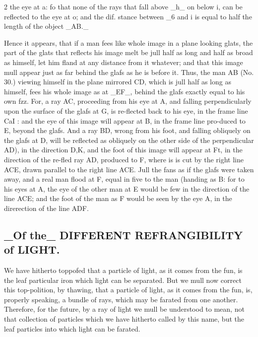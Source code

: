 \documentclass[10pt]{article}
\begin{document}
\begin{multicols}{2}\raggedcolumns
the eye at a: fo that none of the rays that fall above \_h\_ on below i, can be reflected to the eye at o; and the dif. stance between \_6 and i is equal to half the length of the object \_AB.\_

Hence it appears, that if a man fees like whole image in a plane looking glats, the part of the glats that reflects his image melt be jull half as long and half as broad as himself, let him fland at any distance from it whatever; and that this image mull appear just as far behind the glafs as he is before it. Thus, the man AB (No. 30.) viewing himself in the plane mirrored CD, which is jull half as long as himself, fees his whole image as at \_EF\_, behind the glafs exactly equal to his own fzz. For, a ray AC, proceeding from his eye at A, and falling perpendicularly upon the surface of the glafs at G, is re-flected back to his eye, in the frame line CaI : and the eye of this image will appear at B, in the frame line pro-duced to E, beyond the glafs. And a ray BD, wrong from his foot, and falling obliquely on the glafs at D, will be reflected as obliquely on the other side of the perpendicular AD), in the direction D,K, and the foot of this image will appear at Ft, in the direction of the re-fled ray AD, produced to F, where is is cut by the right line ACE, drawn parallel to the right line ACE. Jull the fans as if the glafs were taken away, and a real man flood at F, equal in five to the man (handing as B: for to his eyes at A, the eye of the other man at E would be few in the direction of the line ACE; and the foot of the man as F would be seen by the eye A, in the direrection of the line ADF.

\subsection*{\_Of the\_ DIFFERENT REFRANGIBILITY of LIGHT.}
We have hitherto toppofed that a particle of light, as it comes from the fun, is the leaf particular iron which light can be separated. But we mull now correct this top-polition, by thawing, that a particle of light, as it comes from the fun, is, properly speaking, a bundle of rays, which may be farated from one another. Therefore, for the future, by a ray of light we mull be understood to mean, not that collection of particles which we have hitherto called by this name, but the leaf particles into which light can be farated.


\end{multicols}
\end{document}
